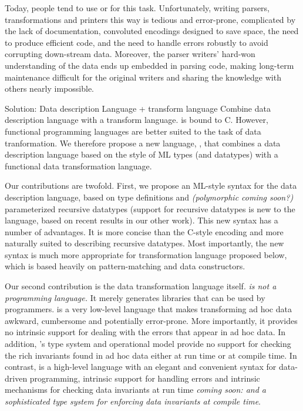 \documentclass{entcs}
\begin{document}
Today, people tend to use \C{} or \perl{} for this task.
Unfortunately, writing parsers, transformations and printers this way
is tedious and error-prone, complicated by the lack of documentation,
convoluted encodings designed to save space, the need to produce
efficient code, and the need to handle errors robustly to avoid
corrupting down-stream data.  Moreover, the parser writers' hard-won
understanding of the data ends up embedded in parsing code, making
long-term maintenance difficult for the original writers and sharing
the knowledge with others nearly impossible.

Solution: Data description Language + transform language
Combine data description language with a transform language.
\pads{} is bound to C. However, functional programming languages are
better suited to the task of data tranformation. We therefore propose
a new language, \datatype{}, that combines a data description language
based on the style of ML types (and datatypes) with a functional data
transformation language. 

Our contributions are twofold. First, we propose an ML-style syntax
for the \pads{} data description language, based on type definitions
and {\em(polymorphic coming soon?)} parameterized recursive datatypes
(support for recursive datatypes is new to the \pads{} language, based
on recent results in our other work). This new syntax has a number of
advantages. It is more concise than the C-style encoding and more
naturally suited to describing recursive datatypes. Most importantly,
the new syntax is much more appropriate for transformation language
proposed below, which is based heavily on pattern-matching and data
constructors.

Our second contribution is the data transformation language itself.
{\em \pads{} is not a programming language.}  It merely generates
libraries that can be used by \C{} programmers.  \C{} is a very
low-level language that makes transforming ad hoc data awkward,
cumbersome and potentially error-prone.  More importantly, it provides
no intrinsic support for dealing with the errors that appear in ad hoc
data.  In addition, \C's type system and operational model provide no
support for checking the rich invariants found in ad hoc data either
at run time or at compile time.  In contrast, \datatype{} is a
high-level language with an elegant and convenient syntax for
data-driven programming, intrinsic support for handling errors and
intrinsic mechanisms for checking data invariants at run time {\em
  coming soon: and a sophisticated type system for enforcing data
  invariants at compile time}. 
\end{document}
